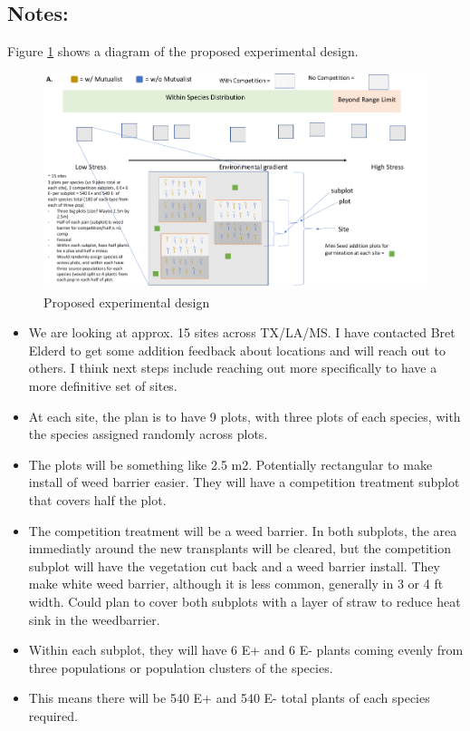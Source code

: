 \documentclass{article}
\begin{document}
 \subsection*{Notes:}
 Figure \ref{fig:rangelimitsexpdesign} shows a diagram of the proposed experimental design.
 \begin{figure}[h!]
 \includegraphics[width = \linewidth]{rangelimitsexpdesign.pdf}
 \caption{Proposed experimental design}
 \label{fig:rangelimitsexpdesign}
 \end{figure}
 \begin{itemize}
 \item{We are looking at approx. 15 sites across TX/LA/MS. I have contacted Bret Elderd to get some addition feedback about locations and will reach out to others. I think next steps include reaching out more specifically to have a more definitive set of sites.}
 \item{At each site, the plan is to have 9 plots, with three plots of each species, with the species assigned randomly across plots.}
 \item{The plots will be something like 2.5 m2. Potentially rectangular to make install of weed barrier easier. They will have a competition treatment subplot that covers half the plot.}
 \item{The competition treatment will be a weed barrier. In both subplots, the area immediatly around the new transplants will be cleared, but the competition subplot will have the vegetation cut back and a weed barrier install. They make white weed barrier, although it is less common, generally in 3 or 4 ft width. Could plan to cover both subplots with a layer of straw to reduce heat sink in the weedbarrier.}
 \item{Within each subplot, they will have 6 E+ and 6 E- plants coming evenly from three populations or population clusters of the species.}
 \item{This means there will be 540 E+ and 540 E- total plants of each species required.}
 \end{itemize}
 
\end{document}
